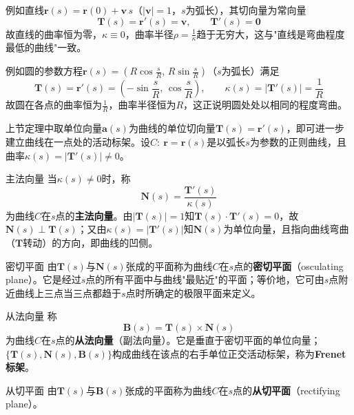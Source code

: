 例如直线$\mathbf{r}(s)=\mathbf{r}(0)+\mathbf{v}\,s$（$|\mathbf{v}|=1$，$s$为弧长），其切向量为常向量
$$\mathbf{T}(s)=\mathbf{r}'(s)=\mathbf{v},\qquad \mathbf{T}'(s)=\mathbf{0}$$
故直线的曲率恒为零，$\kappa\equiv 0$，曲率半径$\rho=\frac{1}{\kappa}$趋于无穷大，这与"直线是弯曲程度最低的曲线"一致。

例如圆的参数方程$\mathbf{r}(s)=(R\cos\frac{s}{R},\,R\sin\frac{s}{R})$（$s$为弧长）满足
$$\mathbf{T}(s)=\mathbf{r}'(s)=\left(-\sin\frac{s}{R},\,\cos\frac{s}{R}\right),\qquad \kappa(s)=|\mathbf{T}'(s)|=\frac{1}{R}$$
故圆在各点的曲率恒为$\frac{1}{R}$，曲率半径恒为$R$，这正说明圆处处以相同的程度弯曲。

上节定理中取单位向量$\mathbf{a}(s)$为曲线的单位切向量$\mathbf{T}(s)=\mathbf{r}'(s)$，即可进一步建立曲线在一点处的活动标架。设$C:\ \mathbf{r}=\mathbf{r}(s)$是以弧长$s$为参数的正则曲线，且曲率$\kappa(s)=|\mathbf{T}'(s)|\neq 0$。

\begin{mydefinition}{主法向量}
	当$\kappa(s)\neq 0$时，称
	\begin{equation}
		\label{eq:principal-normal}
		\mathbf{N}(s)=\frac{\mathbf{T}'(s)}{\kappa(s)}
	\end{equation}
	为曲线$C$在$s$点的\textbf{主法向量}。由$|\mathbf{T}(s)|=1$知$\mathbf{T}(s)\cdot\mathbf{T}'(s)=0$，故$\mathbf{N}(s)\perp\mathbf{T}(s)$；又由$\kappa(s)=|\mathbf{T}'(s)|$知$\mathbf{N}(s)$为单位向量，且指向曲线弯曲（$\mathbf{T}$转动）的方向，即曲线的凹侧。
\end{mydefinition}

\begin{mydefinition}{密切平面}
	由$\mathbf{T}(s)$与$\mathbf{N}(s)$张成的平面称为曲线$C$在$s$点的\textbf{密切平面}（osculating plane）。它是经过$s$点的所有平面中与曲线"最贴近"的平面；等价地，它可由$s$点附近曲线上三点当三点都趋于$s$点时所确定的极限平面来定义。
\end{mydefinition}

\begin{mydefinition}{从法向量}
	称
	\begin{equation}
		\label{eq:binormal}
		\mathbf{B}(s)=\mathbf{T}(s)\times\mathbf{N}(s)
	\end{equation}
	为曲线$C$在$s$点的\textbf{从法向量}（副法向量）。它是垂直于密切平面的单位向量；$\{\mathbf{T}(s),\mathbf{N}(s),\mathbf{B}(s)\}$构成曲线在该点的右手单位正交活动标架，称为\textbf{Frenet标架}。
\end{mydefinition}

\begin{mydefinition}{从切平面}
	由$\mathbf{T}(s)$与$\mathbf{B}(s)$张成的平面称为曲线$C$在$s$点的\textbf{从切平面}（rectifying plane）。
\end{mydefinition}

